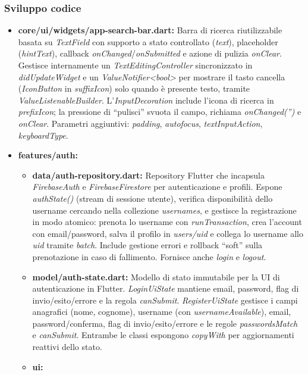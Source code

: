 \documentclass{article}
\begin{document}
\subsubsection{Sviluppo codice}
\begin{itemize}
  \item \textbf{core/ui/widgets/app-search-bar.dart:} Barra di ricerca riutilizzabile basata su \textit{TextField} con supporto a stato controllato (\textit{text}), placeholder (\textit{hintText}), callback \textit{onChanged}/\textit{onSubmitted} e azione di pulizia \textit{onClear}. Gestisce internamente un \textit{TextEditingController} sincronizzato in \textit{didUpdateWidget} e un \textit{ValueNotifier<bool>} per mostrare il tasto cancella (\textit{IconButton} in \textit{suffixIcon}) solo quando è presente testo, tramite \textit{ValueListenableBuilder}. L’\textit{InputDecoration} include l’icona di ricerca in \textit{prefixIcon}; la pressione di “pulisci” svuota il campo, richiama \textit{onChanged('')} e \textit{onClear}. Parametri aggiuntivi: \textit{padding}, \textit{autofocus}, \textit{textInputAction}, \textit{keyboardType}.
  \item \textbf{features/auth:}
  \begin{itemize}
    \item \textbf{data/auth-repository.dart:} Repository Flutter che incapsula \textit{FirebaseAuth} e \textit{FirebaseFirestore} per autenticazione e profili. Espone \textit{authState()} (stream di sessione utente), verifica disponibilità dello username cercando nella collezione \textit{usernames}, e gestisce la registrazione in modo atomico: prenota lo username con \textit{runTransaction}, crea l’account con email/password, salva il profilo in \textit{users/{uid}} e collega lo username allo \textit{uid} tramite \textit{batch}. Include gestione errori e rollback “soft” sulla prenotazione in caso di fallimento. Fornisce anche \textit{login} e \textit{logout}.
    \item \textbf{model/auth-state.dart:} Modello di stato immutabile per la UI di autenticazione in Flutter. \textit{LoginUiState} mantiene email, password, flag di invio/esito/errore e la regola \textit{canSubmit}. \textit{RegisterUiState} gestisce i campi anagrafici (nome, cognome), username (con \textit{usernameAvailable}), email, password/conferma, flag di invio/esito/errore e le regole \textit{passwordsMatch} e \textit{canSubmit}. Entrambe le classi espongono \textit{copyWith} per aggiornamenti reattivi dello stato.
    \item \textbf{ui:}

\end{itemize}
\end{itemize}
\end{document}
